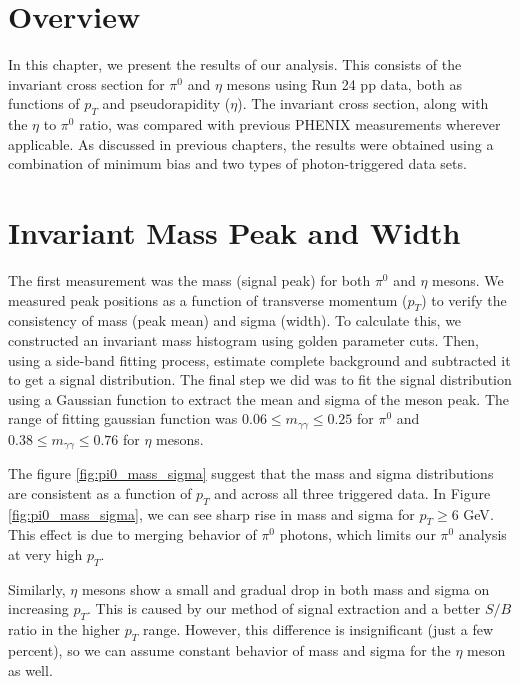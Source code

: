 
\section{Overview}

In this chapter, we present the results of our analysis. This consists of the invariant cross section for $\pi^0$ and $\eta$ mesons using Run 24 \ac{pp} data, both as functions of $p_T$ and pseudorapidity ($\eta$). The invariant cross section, along with the $\eta$ to $\pi^0$ ratio, was compared with previous \ac{PHENIX} measurements wherever applicable. As discussed in previous chapters, the results were obtained using a combination of minimum bias and two types of photon-triggered data sets.


\section{Invariant Mass Peak and Width}

The first measurement was the mass (signal peak) for both $\pi^0$ and $\eta$ mesons. We measured peak positions as a function of transverse momentum ($p_T$) to verify the consistency of mass (peak mean) and sigma (width). To calculate this, we constructed an invariant mass histogram using golden parameter cuts. Then, using a side-band fitting process, estimate complete background and subtracted it to get a signal distribution. The final step we did was to fit the signal distribution using a Gaussian function to extract the mean and sigma of the meson peak. The range of fitting gaussian function was $0.06 \le m_{\gamma \gamma} \le 0.25$ for $\pi^0$ and $0.38 \le m_{\gamma \gamma} \le 0.76$ for $\eta$ mesons.

The figure \ref{fig:pi0_mass_sigma} suggest that the mass and sigma distributions are consistent as a function of $p_T$ and across all three triggered data. In Figure \ref{fig:pi0_mass_sigma}, we can see sharp rise in mass and sigma for $p_T \geq 6 $ \ac{GeV}. This effect is due to merging behavior of $\pi^0$ photons, which limits our $\pi^0$ analysis at very high $p_T$.

Similarly, $\eta$ mesons show a small and gradual drop in both mass and sigma on increasing $p_T$. This is caused by our method of signal extraction and a better $S/B$ ratio in the higher $p_T$ range. However, this difference is insignificant (just a few percent), so we can assume constant behavior of mass and sigma for the $\eta$ meson as well.


